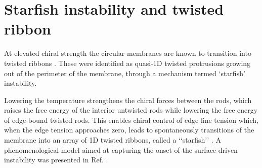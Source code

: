 \section{Starfish instability and twisted ribbon}

At elevated chiral strength the circular membranes are known to transition into twisted ribbons \cite{Gibaud2014}. These were identified as quasi-1D twisted protrusions growing out of the perimeter of the membrane, through a mechanism termed `starfish' instability. 


Lowering the temperature strengthens the chiral forces between the rods, which raises the free energy of the interior untwisted rods while lowering the free energy of edge-bound twisted rods. This enables chiral control of edge line tension which, when the edge tension approaches zero,  leads to spontaneously transitions of the membrane into an array of 1D twisted ribbons, called a ‘‘starfish’’ \cite{Gibaud2014}. A phenomenological model aimed at capturing the onset of the surface-driven instability was presented in Ref. \cite{kang_sm2016}.




